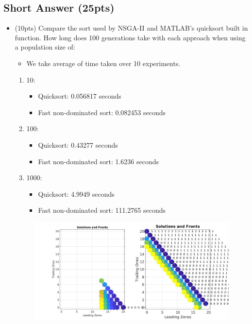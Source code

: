 \documentclass{article}
\begin{document}
\subsection{Short Answer (25pts)}
\begin{itemize}
	\item (10pts) Compare the sort used by NSGA-II and MATLAB's quicksort built in  function. How long does 100 generations take with each approach when using a population size of:
        \begin{itemize}
        \color{blue}
            \item We take average of time taken over 10 experiments.
        \color{black}
        \end{itemize}
	\begin{enumerate}
		\item 10:
			\begin{itemize}
                \item Quicksort: \color{blue}0.056817 seconds\color{black}
			\item Fast non-dominated sort: \color{blue}0.082453 seconds\color{black}
			\end{itemize}
		\item 100:
			\begin{itemize}
			\item Quicksort: \color{blue}0.43277 seconds\color{black}
			\item Fast non-dominated sort: \color{blue}1.6236 seconds\color{black}
			\end{itemize}
		\item 1000:
			\begin{itemize}
			\item Quicksort: \color{blue}4.9949 seconds\color{black}
			\item Fast non-dominated sort: \color{blue}111.2765 seconds\color{black}
			\end{itemize}
	\end{enumerate}
    \begin{figure}[htpb]
        \centering
        \includegraphics[width=1.0\linewidth]{section3point2_bullet1.jpg}

\end{figure}
\end{itemize}
\end{document}
